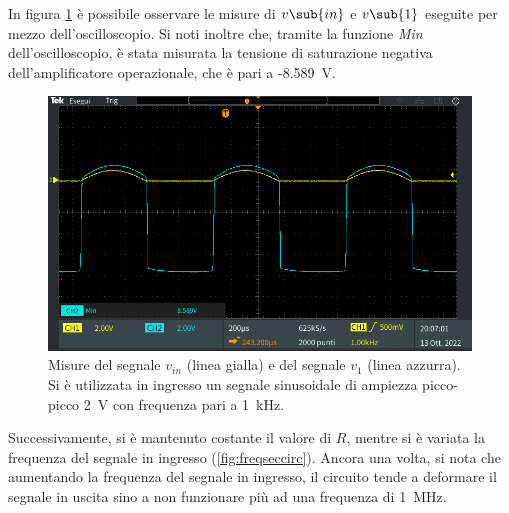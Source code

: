 \noindent
In figura \ref{fig:analisi_circuito_2_1} è possibile osservare le misure di $v\sub{in}$ e $v\sub{1}$ eseguite per mezzo dell'oscilloscopio. Si noti inoltre che, tramite la funzione \textit{Min} dell'oscilloscopio, è stata misurata la tensione di saturazione negativa dell'amplificatore operazionale, che è pari a -\SI{8.589}{\volt}.
\begin{figure}[b]
	\centering
	\includegraphics[width=1\linewidth]{./ImageFiles/Laboratorio 2/TEK00030}
	\caption{Misure del segnale $v_{in}$ (linea gialla) e del segnale $v_{1}$ (linea azzurra). Si è utilizzata in ingresso un segnale sinusoidale di ampiezza picco-picco \SI{2}{\volt} con frequenza pari a \SI{1}{\kilo\hertz}.}
	\label{fig:analisi_circuito_2_1}
\end{figure}
Successivamente, si è mantenuto costante il valore di $R$, mentre si è variata la frequenza del segnale in ingresso (\Fig\ref{fig:freqseccirc}). Ancora una volta, si nota che aumentando la frequenza del segnale in ingresso, il circuito tende a deformare il segnale in uscita sino a non funzionare più ad una frequenza di \SI{1}{\mega\hertz}.
